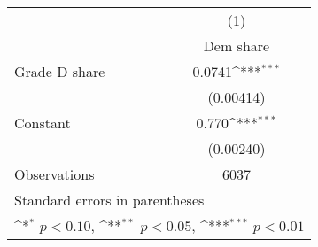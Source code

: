 {
\def\sym#1{\ifmmode^{#1}\else\(^{#1}\)\fi}
\begin{tabular}{l*{1}{c}}
\toprule
                    &\multicolumn{1}{c}{(1)}\\
                    &\multicolumn{1}{c}{Dem share}\\
\midrule
Grade D share       &      0.0741\sym{***}\\
                    &   (0.00414)         \\
\addlinespace
Constant            &       0.770\sym{***}\\
                    &   (0.00240)         \\
\midrule
Observations        &        6037         \\
\bottomrule
\multicolumn{2}{l}{\footnotesize Standard errors in parentheses}\\
\multicolumn{2}{l}{\footnotesize \sym{*} \(p<0.10\), \sym{**} \(p<0.05\), \sym{***} \(p<0.01\)}\\
\end{tabular}
}
